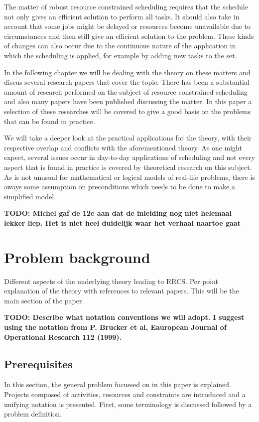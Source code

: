 \documentclass{article}
\newcommand{\TODO}[1]{{\color{red}\textbf{TODO: #1}}}
\begin{document}
The matter of robust resource constrained scheduling requires that the schedule not only gives an efficient solution to perform all tasks. It  should also take in account that some jobs might be delayed or resources become unavailable due to circumstances and then still give an efficient solution to the problem. These kinds of changes can also occur due to the continuous nature of the application in which the scheduling is applied, for example by adding new tasks to the set.

In the following chapter we will be dealing with the theory on these matters and discus several research papers that cover the topic. There has been a substantial amount of research performed on the subject of resource constrained scheduling and also many papers have been published discussing the matter. In this paper a selection of these researches will be covered to give a good basis on the problems that can be found in practice.

We will take a deeper look at the practical applications for the theory, with their respective overlap and conflicts with the aforementioned theory. As one might expect, several issues occur in day-to-day applications of scheduling and not every aspect that is found in practice is covered by theoretical research on this subject. As is not unusual for mathematical or logical models of real-life problems, there is aways some assumption on preconditions which needs to be done to make a simplified model.

\TODO{Michel gaf de 12e aan dat de inleiding nog niet helemaal lekker liep. Het is niet heel duidelijk waar het verhaal naartoe gaat}

\newpage

\section{Problem background}

Different aspects of the underlying theory leading to RRCS.  Per point explanation of the theory with references to relevant papers. This will be the main section of the paper.

\TODO{Describe what notation conventions we will adopt. I suggest using the notation from P. Brucker et al, Eauropean Journal of Operational Research 112 (1999). }

\subsection{Prerequisites}
In this section, the general problem focussed on in this paper is explained. Projects composed of activities, resources and constraints are introduced and a unifying notation is presented. First, some terminology is discussed followed by a problem definition.
\end{document}

